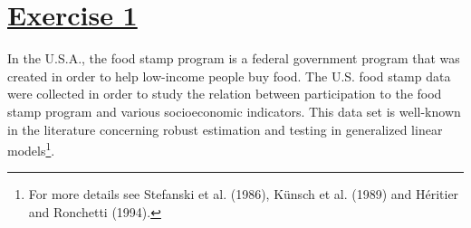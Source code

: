 \documentclass[a4paper,12pt]{article}\usepackage[]{graphicx}\usepackage[]{color}
\begin{document}

\begin{center}
\bigskip

\bigskip

\bigskip

\bigskip

\bigskip

\bigskip


\bigskip

\bigskip
\end{center}



% 

\setlength{\parskip}{1ex plus 0.5ex minus 0.2ex}
\parindent=0cm
\setlength{\parskip}{1ex plus 0.5ex minus 0.2ex}
\linespread{1.1}
\sloppy


\section{\underline{Exercise 1}}

In the U.S.A., the food stamp program is a federal government program that was created in order to help low-income people buy food. The U.S. food stamp data were collected in order to study the relation between participation to the food stamp program and various socioeconomic indicators. This data set is well-known in the literature concerning robust estimation and testing in generalized linear models\footnote{For more details see Stefanski et al. (1986), K\"{u}nsch et al. (1989) and H\'{e}ritier and Ronchetti (1994).}.
\end{document}
